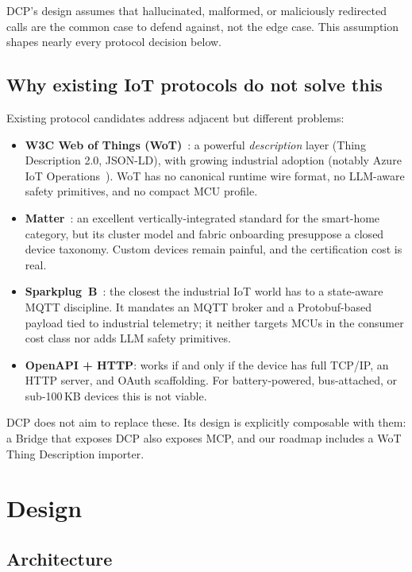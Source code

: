 \documentclass[11pt,a4paper]{article}
\begin{document}
DCP's design assumes that hallucinated, malformed, or maliciously
redirected calls are the common case to defend against, not the edge case.
This assumption shapes nearly every protocol decision below.

\subsection{Why existing IoT protocols do not solve this}

Existing protocol candidates address adjacent but different problems:

\begin{itemize}[leftmargin=*,nosep]
  \item \textbf{W3C Web of Things (WoT)}~\cite{wot_td_2025}: a powerful
        \emph{description} layer (Thing Description 2.0, JSON-LD), with
        growing industrial adoption (notably Azure IoT
        Operations~\cite{azure_wot_2025}). WoT has no canonical runtime wire
        format, no LLM-aware safety primitives, and no compact MCU profile.
  \item \textbf{Matter}~\cite{matter_spec}: an excellent vertically-integrated
        standard for the smart-home category, but its cluster model and
        fabric onboarding presuppose a closed device taxonomy. Custom
        devices remain painful, and the certification cost is real.
  \item \textbf{Sparkplug~B}~\cite{sparkplug}: the closest the industrial IoT
        world has to a state-aware MQTT discipline. It mandates an MQTT
        broker and a Protobuf-based payload tied to industrial telemetry;
        it neither targets MCUs in the consumer cost class nor adds LLM
        safety primitives.
  \item \textbf{OpenAPI + HTTP}: works if and only if the device has full
        TCP/IP, an HTTP server, and OAuth scaffolding. For battery-powered,
        bus-attached, or sub-100\,KB devices this is not viable.
\end{itemize}

DCP does not aim to replace these. Its design is explicitly composable with
them: a Bridge that exposes DCP also exposes MCP, and our roadmap includes
a WoT Thing Description importer.

\section{Design}\label{sec:design}

\subsection{Architecture}
\end{document}
